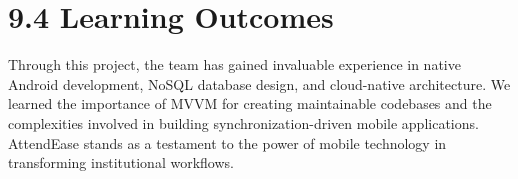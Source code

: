 \documentclass[12pt,a4paper]{report}
\begin{document}
\section*{9.4 Learning Outcomes}
Through this project, the team has gained invaluable experience in native Android development, NoSQL database design, and cloud-native architecture. We learned the importance of MVVM for creating maintainable codebases and the complexities involved in building synchronization-driven mobile applications. AttendEase stands as a testament to the power of mobile technology in transforming institutional workflows.

\end{document}
